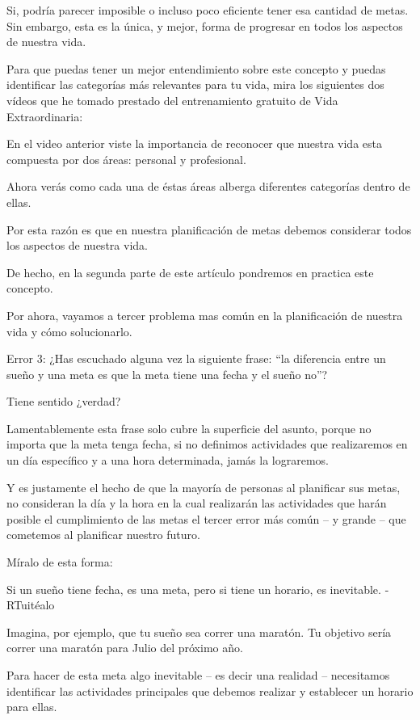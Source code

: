 \documentclass[12pt]{book}
\begin{document}
Si, podría parecer imposible o incluso poco eficiente tener esa cantidad de metas. Sin embargo, esta es la única, y mejor, forma de progresar en todos los aspectos de nuestra vida.

Para que puedas tener un mejor entendimiento sobre este concepto y puedas identificar las categorías más relevantes para tu vida, mira los siguientes dos vídeos que he tomado prestado del entrenamiento gratuito de Vida Extraordinaria:



En el video anterior viste la importancia de reconocer que nuestra vida esta compuesta por dos áreas: personal y profesional.

Ahora verás como cada una de éstas áreas alberga diferentes categorías dentro de ellas.



Por esta razón es que en nuestra planificación de metas debemos considerar todos los aspectos de nuestra vida.

De hecho, en la segunda parte de este artículo pondremos en practica este concepto.

Por ahora, vayamos a tercer problema mas común en la planificación de nuestra vida y cómo solucionarlo.

Error 3:
¿Has escuchado alguna vez la siguiente frase: “la diferencia entre un sueño y una meta es que la meta tiene una fecha y el sueño no”?

Tiene sentido ¿verdad?

Lamentablemente esta frase solo cubre la superficie del asunto, porque no importa que la meta tenga fecha, si no definimos actividades que realizaremos en un día específico y a una hora determinada, jamás la lograremos.

Y es justamente el hecho de que la mayoría de personas al planificar sus metas, no consideran la día y la hora en la cual realizarán las actividades que harán posible el cumplimiento de las metas el tercer error más común – y grande – que cometemos al planificar nuestro futuro.

Míralo de esta forma:

Si un sueño tiene fecha, es una meta, pero si tiene un horario, es inevitable. - RTuitéalo

Imagina, por ejemplo, que tu sueño sea correr una maratón. Tu objetivo sería correr una maratón para Julio del próximo año.

Para hacer de esta meta algo inevitable – es decir una realidad – necesitamos identificar las actividades principales que debemos realizar y establecer un horario para ellas.
\end{document}
